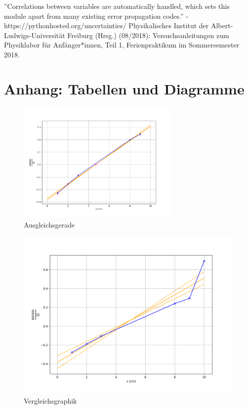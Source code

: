 \documentclass[11pt,a4paper]{article}
\begin{document}





\vfill
\begin{thebibliography}{9}
''Correlations between variables are automatically handled, which sets this module apart from many existing error propagation codes.'' - https://pythonhosted.org/uncertainties/
 Physikalisches Institut der Albert-Ludwigs-Universität Freiburg (Hrsg.) (08/2018): Versuchsanleitungen zum Physiklabor für Anfänger*innen, Teil 1, Ferienpraktikum im Sommersemester 2018.
\end{thebibliography}

\pagebreak

\section{Anhang: Tabellen und Diagramme}

\begin{figure}[h]
\centering
\includegraphics[width=0.7\textwidth]{discluding_10.png}
\renewcommand\thefigure{1} \vspace{-20pt} 
\caption[Graphik Messpunkte mit Ausgleichsgerade]{Ausgleichsgerade}
\label{Abb:1}
\end{figure}

\begin{figure}[h]
\centering
\includegraphics[width=.7\textwidth]{including_10.png}
\renewcommand\thefigure{2} \vspace{-20pt} 
\caption[Vergleichsgraphik]{Vergleichsgraphik}
\label{Abb:2}
\end{figure}
\end{document}
